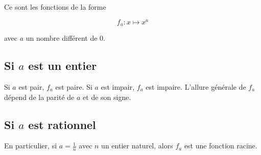 Ce sont les fonctions de la forme 

$$
f_a: x \mapsto x^a
$$

avec $a$ un nombre différent de 0.\\

\subsection*{Si $a$ est un entier}
Si $a$ est pair, $f_a$ est paire. Si $a$ est impair, $f_a$ est impaire.
L'allure générale de $f_a$ dépend de la parité de $a$ et de son signe.

\begin{figure}[H]
    \centering
    \begin{minipage}{0.45\textwidth}
    \end{minipage}
    \hfill
    \begin{minipage}{0.45\textwidth}
    \end{minipage}
\end{figure}

\subsection*{Si $a$ est rationnel}

En particulier, si $a=\frac{1}{n}$ avec $n$ un entier naturel, alors $f_a$ est une fonction racine.

\begin{figure}[H]
    \centering
\end{figure}

